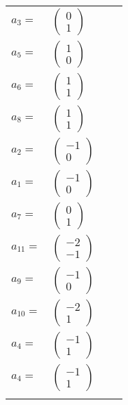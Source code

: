 \documentclass[1p]{elsarticle_modified}
\theoremstyle{definition}
\begin{document}
\begin{tabular}{m{7pt} m{180pt} m{7pt} m{180pt} }
\flushright $a_{3}=$&$\begin{pmatrix}0\\1\end{pmatrix}$ \\
\flushright $a_{5}=$&$\begin{pmatrix}1\\0\end{pmatrix}$ \\
\flushright $a_{6}=$&$\begin{pmatrix}1\\1\end{pmatrix}$ \\
\flushright $a_{8}=$&$\begin{pmatrix}1\\1\end{pmatrix}$ \\
\flushright $a_{2}=$&$\begin{pmatrix}-1\\0\end{pmatrix}$ \\
\flushright $a_{1}=$&$\begin{pmatrix}-1\\0\end{pmatrix}$ \\
\flushright $a_{7}=$&$\begin{pmatrix}0\\1\end{pmatrix}$ \\
\flushright $a_{11}=$&$\begin{pmatrix}-2\\-1\end{pmatrix}$ \\
\flushright $a_{9}=$&$\begin{pmatrix}-1\\0\end{pmatrix}$ \\
\flushright $a_{10}=$&$\begin{pmatrix}-2\\1\end{pmatrix}$ \\
\flushright $a_{4}=$&$\begin{pmatrix}-1\\1\end{pmatrix}$\\ \flushright $a_{4}=$&$\begin{pmatrix}-1\\1\end{pmatrix}$\\&\end{tabular}
\end{document}
